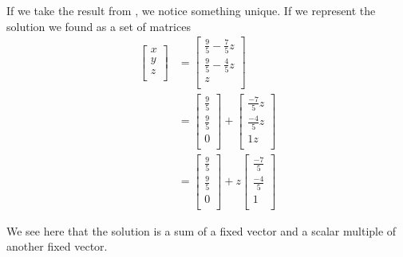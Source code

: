 If we take the result from , we notice something unique.
If we represent the solution we found as a set of matrices
\begin{align*}
  \begin{bmatrix}
    x \\
    y \\
    z \\
  \end{bmatrix}
  &=
    \begin{bmatrix}
      \frac{9}{5} - \frac{7}{5} z \\
      \frac{9}{5} - \frac{4}{5} z \\
      z \\
    \end{bmatrix} \\
  &=
    \begin{bmatrix}
      \frac{9}{5} \\
      \frac{9}{5} \\
      0 \\
    \end{bmatrix}
  +
  \begin{bmatrix}
    \frac{-7}{5}z \\
    \frac{-4}{5}z \\
    1z \\
  \end{bmatrix} \\
  &= \begin{bmatrix}
    \frac{9}{5} \\
    \frac{9}{5} \\
    0 \\
  \end{bmatrix}
  + z
  \begin{bmatrix}
    \frac{-7}{5} \\
    \frac{-4}{5} \\
    1 \\
  \end{bmatrix}
\end{align*}

We see here that the solution is a sum of a fixed vector and a scalar multiple of another fixed vector.

